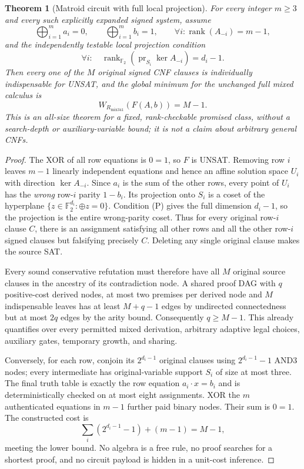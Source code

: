 \documentclass[11pt]{article}
\newtheorem{theorem}{Theorem}
\begin{document}
\begin{theorem}[Matroid circuit with full local projection]
For every integer $m\ge3$ and every such explicitly expanded signed system, assume
\[
\bigoplus_{i=1}^{m}a_i=0,\qquad
\bigoplus_{i=1}^{m}b_i=1,\qquad
\forall i:\operatorname{rank}(A_{-i})=m-1,
\]
and the independently testable local projection condition
\[
\forall i:\quad
\operatorname{rank}_{\mathbb F_2}
\left(\operatorname{pr}_{S_i}\ker A_{-i}\right)=d_i-1.
\tag{P}
\]
Then every one of the $M$ original signed CNF clauses is individually indispensable for UNSAT, and the \emph{global} minimum for the unchanged full mixed calculus is
\[
\boxed{W_{R_{\mathrm{mix341}}}(F(A,b))=M-1.}
\]
This is an all-size theorem for a fixed, rank-checkable promised class, without a search-depth or auxiliary-variable bound; it is not a claim about arbitrary general CNFs.
\end{theorem}
\begin{proof}
The XOR of all row equations is $0=1$, so $F$ is UNSAT. Removing row $i$ leaves $m-1$ linearly independent equations and hence an affine solution space $U_i$ with direction $\ker A_{-i}$. Since $a_i$ is the sum of the other rows, every point of $U_i$ has the \emph{wrong} row-$i$ parity $1-b_i$. Its projection onto $S_i$ is a coset of the hyperplane $\{z\in\mathbb F_2^{d_i}:\oplus z=0\}$. Condition (P) gives the full dimension $d_i-1$, so the projection is the entire wrong-parity coset. Thus for every original row-$i$ clause $C$, there is an assignment satisfying all other rows and all the other row-$i$ signed clauses but falsifying precisely $C$. Deleting any single original clause makes the source SAT.

Every sound conservative refutation must therefore have all $M$ original source clauses in the ancestry of its contradiction node. A shared proof DAG with $q$ positive-cost derived nodes, at most two premises per derived node and $M$ indispensable leaves has at least $M+q-1$ edges by undirected connectedness but at most $2q$ edges by the arity bound. Consequently $q\ge M-1$. This already quantifies over every permitted mixed derivation, arbitrary adaptive legal choices, auxiliary gates, temporary growth, and sharing.

Conversely, for each row, conjoin its $2^{d_i-1}$ original clauses using $2^{d_i-1}-1$ AND3 nodes; every intermediate has original-variable support $S_i$ of size at most three. The final truth table is exactly the row equation $a_i\cdot x=b_i$ and is deterministically checked on at most eight assignments. XOR the $m$ authenticated equations in $m-1$ further paid binary nodes. Their sum is $0=1$. The constructed cost is
\[
\sum_i(2^{d_i-1}-1)+(m-1)=M-1,
\]
meeting the lower bound. No algebra is a free rule, no proof searches for a shortest proof, and no circuit payload is hidden in a unit-cost inference.
\end{proof}
\end{document}
